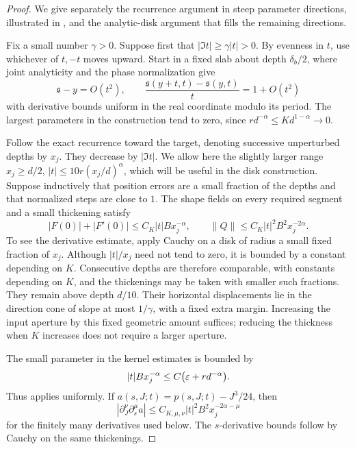 \begin{proof}
We give separately the recurrence argument in steep parameter
directions, illustrated in , and the analytic-disk argument that fills the remaining
directions.

Fix a small number \(\gamma>0\). Suppose first that
\(|\Im t|\ge\gamma|t|>0\). By evenness in \(t\), use whichever of
\(t,-t\) moves upward. Start in a fixed slab about depth
\(\delta_b/2\), where joint analyticity and the phase normalization give
\[
 \mathfrak s-y=O(t^2),\qquad
 \frac{\mathfrak s(y+t,t)-\mathfrak s(y,t)}{t}=1+O(t^2)
\]
with derivative bounds uniform in the real coordinate modulo its
period. The largest parameters in the construction tend to zero,
since \(r d^{-\alpha}\le Kd^{1-\alpha}\to0\).

Follow the exact recurrence toward the target, denoting successive
unperturbed depths by \(x_j\). They decrease by \(|\Im t|\). We allow
here the slightly larger range
\(x_j\ge d/2\), \(|t|\le10r(x_j/d)^\alpha\), which will be useful in
the disk construction. Suppose inductively that position errors are a
small fraction of the depths and that normalized steps are close to
\(1\). The shape fields on every required segment and a small
thickening satisfy
\[
 |F(0)|+|F'(0)|\le C_K|t|Bx_j^{-\alpha},\qquad
 \|Q\|\le C_K|t|^2B^2x_j^{-2\alpha}.
\]
To see the derivative estimate, apply Cauchy on a disk of radius a
small fixed fraction of \(x_j\). Although \(|t|/x_j\) need not tend to
zero, it is bounded by a constant depending on \(K\). Consecutive
depths are therefore comparable, with constants depending on \(K\),
and the thickenings may be taken with smaller such fractions. They
remain above depth \(d/10\). Their horizontal displacements lie in the
direction cone of slope at most \(1/\gamma\), with a fixed extra
margin. Increasing the input aperture by this fixed geometric amount
suffices; reducing the thickness when \(K\) increases does not require
a larger aperture.

The small parameter in the kernel estimates is bounded by
\[
 |t|Bx_j^{-\alpha}
 \le C\bigl(\varepsilon+rd^{-\alpha}\bigr).
\]
Thus  applies uniformly. If
\(a(s,J;t)=p(s,J;t)-J^3/24\), then
\begin{equation}\label{cone:action-estimates}
 |\partial_J^\nu\partial_s^\mu a|
 \le C_{K,\mu,\nu}|t|^2B^2x_j^{-2\alpha-\mu}
\end{equation}
for the finitely many derivatives used below. The \(s\)-derivative
bounds follow by Cauchy on the same thickenings.


\end{proof}
